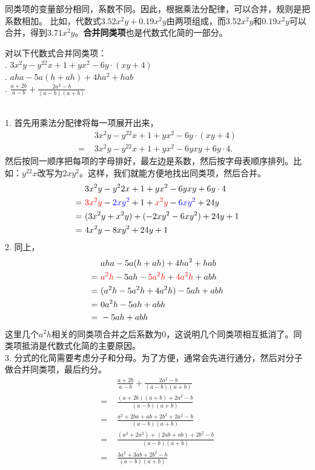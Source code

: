 \documentclass[12pt,UTF8,fontset=none]{ctexbook}
\begin{document}
同类项的变量部分相同，系数不同。因此，根据乘法分配律，可以合并，规则是把系数相加。
比如，代数式$3.52x^2y + 0.19x^2y$由两项组成，而$3.52x^2y$和$0.19x^2y$可以合并，得到$3.71x^2y$。\textbf{合并同类项}也是代数式化简的一部分。
\begin{et}
    对以下代数式合并同类项：\\
    . $3x^2y - y^22x + 1 + yx^2 - 6y\cdot (xy + 4)$ \\
    . $aha - 5a(h + ah) + 4ha^2 + hab$ \\
    . $\frac{a + 2b}{a - b} + \frac{2a^2 - b}{(a - b)(a + b)}$ 
\end{et}
\begin{so}
    \mbox{}\\
    1. 首先用乘法分配律将每一项展开出来，
    \begin{align*}
             & 3x^2y - y^22x + 1 + yx^2 - 6y\cdot (xy + 4)  \\
        =\,\,& 3x^2y - y^22x + 1 + yx^2 - 6yxy + 6y\cdot 4. 
    \end{align*}
    然后按同一顺序把每项的字母排好，最左边是系数，然后按字母表顺序排列。比如：$y^22x$改写为$2xy^2$。这样，我们就能方便地找出同类项，然后合并。
    \begin{align*}
             &3x^2y - y^22x + 1 + yx^2 - 6yxy + 6y\cdot 4  \\
        =\,\,&{\color{red}3x^2y} - {\color{blue}2xy^2} + 1 + {\color{red}x^2y} - {\color{blue}6xy^2} + 24y  \\
        =\,\,&(3x^2y + x^2y) + (- 2xy^2 - 6xy^2) + 24y + 1  \\
        =\,\,&4x^2y - 8xy^2 + 24 y + 1 
    \end{align*}
    2. 同上，
    \begin{align*}
             & aha - 5a(h + ah) + 4ha^2 + hab  \\
        =\,\,& {\color{red}a^2h} - 5ah - {\color{red}5a^2h} + {\color{red}4a^2h} + abh  \\
        =\,\,& (a^2h  - 5a^2h + 4a^2h) - 5ah + abh  \\
        =\,\,& 0a^2h - 5ah + abh  \\
        =\,\,& - 5ah + abh  
    \end{align*}
    这里几个$a^2h$相关的同类项合并之后系数为$0$，这说明几个同类项相互抵消了。同类项抵消是代数式化简的主要原因。\\
    3. 分式的化简需要考虑分子和分母。为了方便，通常会先进行通分，然后对分子做合并同类项，最后约分。
    \begin{align*}
             & \frac{a + 2b}{a - b} + \frac{2a^2 - b}{(a - b)(a + b)}  \\
        =\,\,& \frac{(a + 2b)(a + b) + 2a^2 - b}{(a - b)(a + b)}  \\
        =\,\,& \frac{a^2 + 2ba + ab + 2b^2 + 2a^2 - b}{(a - b)(a + b)}  \\
        =\,\,& \frac{(a^2 + 2a^2) + (2ab + ab) + 2b^2 - b}{(a - b)(a + b)}  \\
        =\,\,& \frac{3a^2 + 3ab + 2b^2 - b}{(a - b)(a + b)}  
    \end{align*}
\end{so}
\end{document}
